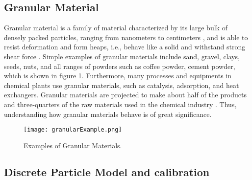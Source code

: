 \documentclass[../BachelorAssignment.tex]{subfiles}
\begin{document}
\graphicspath{{\subfix{../Images/}}}

\subsection{Granular Material}



 Granular material is a family of material characterized by its large bulk of densely packed particles, ranging from nanometers to centimeters \cite{introGranular2}, and is able to resist deformation and form heaps, i.e., behave like a solid and withstand strong shear force \cite{introGranular3}. Simple examples of granular materials include sand, gravel, clays, seeds, nuts, and all ranges of powders such as coffee powder, cement powder, which is shown in figure \ref{fig:granularExample}. Furthermore, many processes and equipments in chemical plants use granular materials, such as catalysis, adsorption, and heat exchangers. Granular materials are projected to make about half of the products and three-quarters of the raw materials used in the chemical industry \cite{introGranular}. Thus, understanding how granular materials behave is of great significance. 

 \begin{figure}[H]
    \centering
    \texttt{[image: granularExample.png]}
    \caption{Examples of Granular Materials.\cite{granularExample}}
    \label{fig:granularExample}
\end{figure}



\subsection{Discrete Particle Model and calibration}
\end{document}
